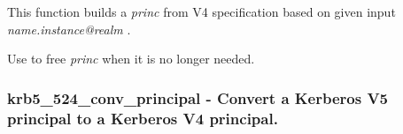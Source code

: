 \documentclass[letterpaper,10pt,english]{sphinxmanual}
\begin{document}
This function builds a \emph{princ} from V4 specification based on given input \emph{name.instance@realm} .

Use {\hyperref[appdev/refs/api/krb5_free_principal:krb5_free_principal]{}} to free \emph{princ} when it is no longer needed.


\subsubsection{krb5\_524\_conv\_principal -  Convert a Kerberos V5 principal to a Kerberos V4 principal.}
\label{appdev/refs/api/krb5_524_conv_principal:krb5-524-conv-principal-convert-a-kerberos-v5-principal-to-a-kerberos-v4-principal}\label{appdev/refs/api/krb5_524_conv_principal::doc}

\begin{fulllineitems}
\label{appdev/refs/api/krb5_524_conv_principal:krb5_524_conv_principal}
\end{fulllineitems}
\end{document}
